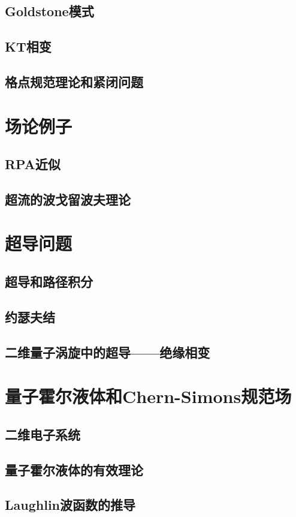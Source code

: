 \documentclass{book}
\begin{document}
\section{Goldstone模式}
\section{KT相变}
\section{格点规范理论和紧闭问题}
\chapter{场论例子}
\section{RPA近似}
\section{超流的波戈留波夫理论}
\chapter{超导问题}
\section{超导和路径积分}
\section{约瑟夫结}
\section{二维量子涡旋中的超导——绝缘相变}
\chapter{量子霍尔液体和Chern-Simons规范场}
\section{二维电子系统}
\section{量子霍尔液体的有效理论}
\section{Laughlin波函数的推导}
\end{document}
